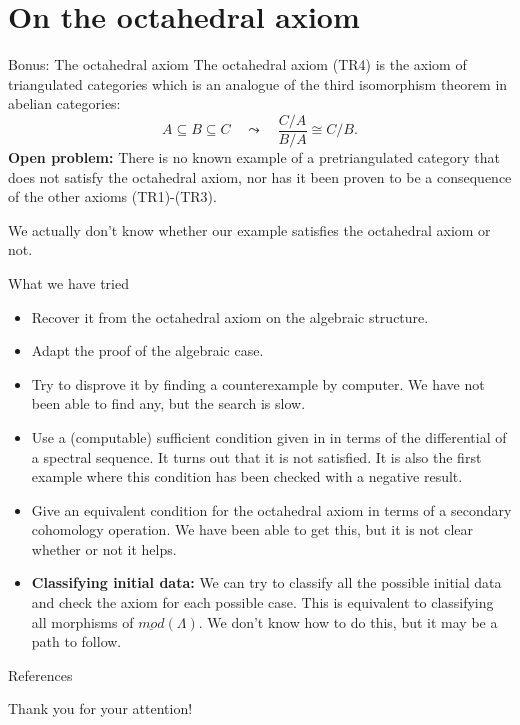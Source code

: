 \documentclass{beamer}
\begin{document}
\section{On the octahedral axiom}

\begin{frame}{Bonus: The octahedral axiom}
   The octahedral axiom (TR4) is the axiom of triangulated categories which is an analogue of the third isomorphism theorem in abelian categories:
   $$ A\subseteq B \subseteq C \quad \leadsto \quad \frac{C/A}{B/A} \cong C/B. $$
  \pause
  \textbf{Open problem:} There is no known example of a pretriangulated category that does not satisfy the octahedral axiom, nor has it been proven to be a consequence of the other axioms (TR1)-(TR3).  
  
  \vspace{4mm}
  We actually don't know whether our example satisfies the octahedral axiom or not.
\end{frame}


\begin{frame}{What we have tried}
    \begin{itemize}
      \item Recover it from the octahedral axiom on the algebraic structure.
      \item Adapt the proof of the algebraic case. \pause
      \item Try to disprove it by finding a counterexample by computer. We have not been able to find any, but the search is slow. \pause
      \item Use a (computable) sufficient condition given in \cite{muro_2020_first_obstructions_enhancing} in terms of the differential of a spectral sequence. It turns out that it is not satisfied. It is also the first example where this condition has been checked with a negative result. \pause
    \end{itemize}
\end{frame}

\begin{frame}
  \begin{itemize}
    \item Give an equivalent condition for the octahedral axiom in terms of a secondary cohomology operation. We have been able to get this, but it is not clear whether or not it helps. \pause
    \item \textbf{Classifying initial data:} We can try to classify all the possible initial data and check the axiom for each possible case. This is equivalent to classifying all morphisms of $\underline{mod}(\Lambda)$. We don't know how to do this, but it may be a path to follow.
  \end{itemize}
\end{frame}






\begin{frame}[allowframebreaks]{References}
    \printbibliography
\end{frame}

\begin{frame}
  \begin{center}
    Thank you for your attention!
  \end{center}
\end{frame}
\end{document}
